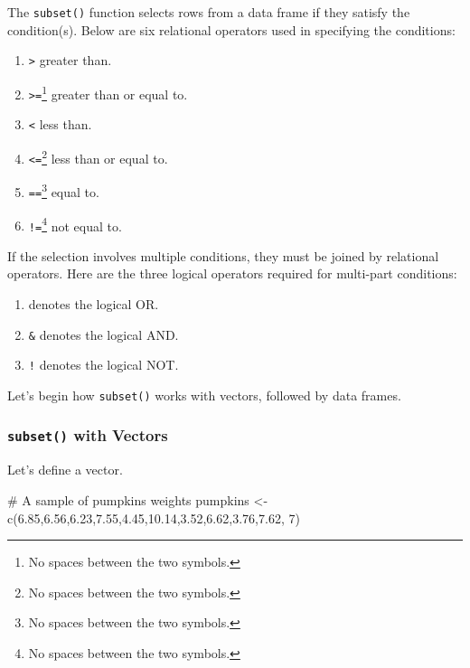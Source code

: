 \documentclass[
  letterpaper,
  DIV=11,
  numbers=noendperiod]{scrreprt}
\newenvironment{Shaded}{\begin{snugshade}}{\end{snugshade}}
\newcommand{\CommentTok}[1]{\textcolor[rgb]{0.37,0.37,0.37}{#1}}
\newcommand{\DecValTok}[1]{\textcolor[rgb]{0.68,0.00,0.00}{#1}}
\newcommand{\FloatTok}[1]{\textcolor[rgb]{0.68,0.00,0.00}{#1}}
\newcommand{\FunctionTok}[1]{\textcolor[rgb]{0.28,0.35,0.67}{#1}}
\newcommand{\NormalTok}[1]{\textcolor[rgb]{0.00,0.23,0.31}{#1}}
\newcommand{\OtherTok}[1]{\textcolor[rgb]{0.00,0.23,0.31}{#1}}
\begin{document}
The \texttt{subset()} function selects rows from a data frame if they
satisfy the condition(s). Below are six relational operators used in
specifying the conditions:

\begin{enumerate}
\def\labelenumi{\arabic{enumi}.}
\item
  \texttt{\textgreater{}} greater than.
\item
  \texttt{\textgreater{}=}\footnote{No spaces between the two symbols.}
  greater than or equal to.
\item
  \texttt{\textless{}} less than.
\item
  \texttt{\textless{}=}\footnote{No spaces between the two symbols.}
  less than or equal to.
\item
  \texttt{==}\footnote{No spaces between the two symbols.} equal to.
\item
  \texttt{!=}\footnote{No spaces between the two symbols.} not equal to.
\end{enumerate}

If the selection involves multiple conditions, they must be joined by
relational operators. Here are the three logical operators required for
multi-part conditions:

\begin{enumerate}
\def\labelenumi{\arabic{enumi}.}
\item
  \texttt{\textbar{}} denotes the logical OR.
\item
  \texttt{\&} denotes the logical AND.
\item
  \texttt{!} denotes the logical NOT.
\end{enumerate}

Let's begin how \texttt{subset()} works with vectors, followed by data
frames.

\subsubsection{\texorpdfstring{\texttt{subset()} with
Vectors}{subset() with Vectors}}\label{subset-with-vectors}

Let's define a vector.

\begin{Shaded}
\begin{Highlighting}[]
\CommentTok{\# A sample of pumpkins\textquotesingle{} weights}
\NormalTok{pumpkins }\OtherTok{\textless{}{-}} \FunctionTok{c}\NormalTok{(}\FloatTok{6.85}\NormalTok{,}\FloatTok{6.56}\NormalTok{,}\FloatTok{6.23}\NormalTok{,}\FloatTok{7.55}\NormalTok{,}\FloatTok{4.45}\NormalTok{,}\FloatTok{10.14}\NormalTok{,}\FloatTok{3.52}\NormalTok{,}\FloatTok{6.62}\NormalTok{,}\FloatTok{3.76}\NormalTok{,}\FloatTok{7.62}\NormalTok{, }\DecValTok{7}\NormalTok{)}
\end{Highlighting}
\end{Shaded}
\end{document}
